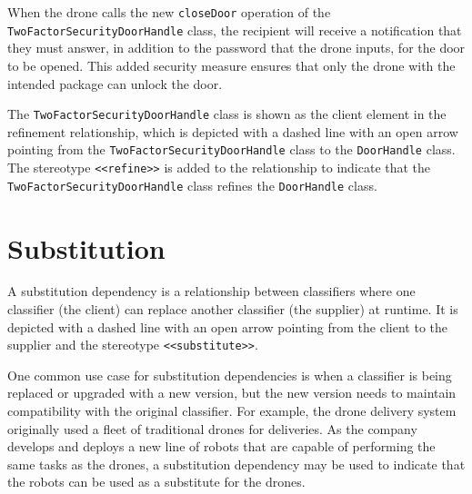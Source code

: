 \documentclass[
	12pt,
    a4paper,
    egregdoesnotlikesansseriftitles, %
    toc=chapterentrywithdots,
    oneside, openany,
    titlepage,
    parskip=half,
    headings=normal,  %
    listof=totoc,
    bibliography=totocnumbered,
    index=totoc,
    captions=tableheading,  %
    listof=flat,
    numbers=noenddot, %
    final]
    {scrbook}
\begin{document}
When the drone calls the new \texttt{closeDoor} operation of the \texttt{TwoFactorSecurityDoorHandle} class, the recipient will receive a notification that they must answer, in addition to the password that the drone inputs, for the door to be opened. This added security measure ensures that only the drone with the intended package can unlock the door.

The \texttt{TwoFactorSecurityDoorHandle} class is shown as the client element in the refinement relationship, which is depicted with a dashed line with an open arrow pointing from the \texttt{TwoFactorSecurityDoorHandle} class to the \texttt{DoorHandle} class. The stereotype \texttt{<<refine>>} is added to the relationship to indicate that the \texttt{TwoFactorSecurityDoorHandle} class refines the \texttt{DoorHandle} class.

\section{Substitution}

A substitution dependency is a relationship between classifiers where one classifier (the client) can replace another classifier (the supplier) at runtime. 
It is depicted with a dashed line with an open arrow pointing from the client to the supplier and the stereotype \texttt{<<substitute>>}. \cite[p.165]{uml}


One common use case for substitution dependencies is when a classifier is being replaced or upgraded with a new version, but the new version needs to maintain compatibility with the original classifier. 
For example, the drone delivery system originally used a fleet of traditional drones for deliveries. As the company develops and deploys a new line of robots that are capable of performing the same tasks as the drones, a substitution dependency may be used to indicate that the robots can be used as a substitute for the drones.
\end{document}
